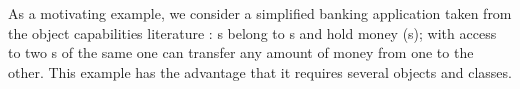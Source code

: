 

As a motivating example, we consider a simplified banking application 
taken from the object capabilities literature \cite{ELang}:
 s belong to s and hold money (s);  
with access  to two s of the same   one can  transfer any amount of money from
 one to the other.  %
This example has the advantage that it requires several objects and classes.

%
%

